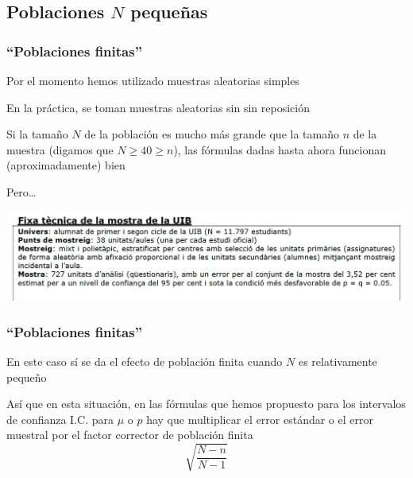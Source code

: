 \documentclass[12pt,t]{beamer}
\renewcommand{\emph}[1]{{\color{red}#1}}
\renewcommand{\geq}{\geqslant}
\theoremstyle{plain}
\theoremstyle{definition}
\begin{document}
\subsection{Poblaciones $N$ pequeñas}
\begin{frame}
\frametitle{``Poblaciones finitas''}
Por el momento hemos utilizado  muestras  aleatorias simples
\medskip

En la práctica,  se toman muestras aleatorias sin sin reposición
\medskip

Si la  tamaño  $N$ de la población es mucho más grande que la  tamaño  $n$ de la muestra (digamos que  $N\geq 40\geq n$), las fórmulas dadas hasta ahora  funcionan (aproximadamente) bien
\medskip

Pero\ldots
\vspace*{-4ex}

\begin{center}
\hspace*{-0.5cm}\includegraphics[width=1.1\linewidth]{plagiUIB2.jpg}
\end{center}


\end{frame}

\begin{frame}
\frametitle{``Poblaciones finitas''}

En este caso sí se da el efecto de \emph{población finita} cuando $N$ es relativamente pequeño
\medskip

Así que en esta situación, en las fórmulas que hemos propuesto para los intervalos de confianza  I.C. para $\mu$ o $p$ hay que multiplicar el error estándar o el error muestral por el factor corrector de población finita
$$
\sqrt{\frac{N-n}{N-1}}
$$

\end{frame}
\end{document}
